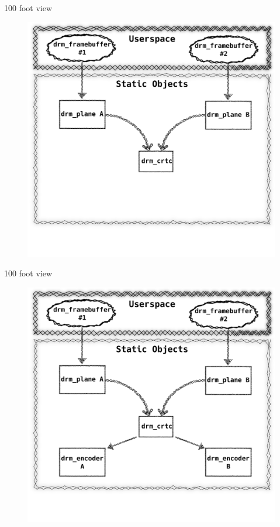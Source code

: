 \documentclass[10pt, compress, aspectratio=169]{beamer}
\begin{document}
\begin{frame}{100 foot view}
  \begin{figure}
    \centering
    \includegraphics[width=\linewidth,
                     height=0.8\textheight,
                     keepaspectratio]{drm_internals_3-min}
  \end{figure}
\end{frame}

\begin{frame}{100 foot view}
  \begin{figure}
    \centering
    \includegraphics[width=\linewidth,
                     height=0.8\textheight,
                     keepaspectratio]{drm_internals_4-min}
  \end{figure}
\end{frame}
\end{document}
